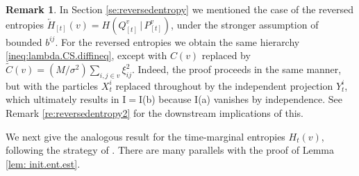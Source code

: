 \documentclass[11pt,reqno]{amsart}
\numberwithin{equation}{section}
\theoremstyle{definition}
\newtheorem{remark}[theorem]{Remark}
\begin{document}
\begin{remark} \label{re:reversedentropy1}
In Section \ref{se:reversedentropy} we mentioned the case of the reversed entropies $\overleftarrow{H}_{[t]}(v)=H(Q^v_{[t]}\,|\,P^v_{[t]})$, under the stronger assumption of bounded $b^{ij}$. For the reversed entropies we obtain the same hierarchy \eqref{ineq:lambda.CS.diffineq}, except with $C(v)$ replaced by $\widetilde{C}(v)=(M/\sigma^2)\sum_{i,j \in v} \xi_{ij}^2$. Indeed, the proof proceeds in the same manner, but with the particles $X^i_t$ replaced throughout by the independent projection $Y^i_t$, which ultimately results in I$=$I(b) because I(a) vanishes by independence. See Remark \ref{re:reversedentropy2} for the downstream implications of this.
\end{remark}
		
		We next give the analogous result for the time-marginal entropies $H_t(v)$, following the strategy of \cite[Section 3.3]{lacker2023sharp}. There are many parallels with the proof of Lemma \ref{lem: init.ent.est}.
		
\end{document}
